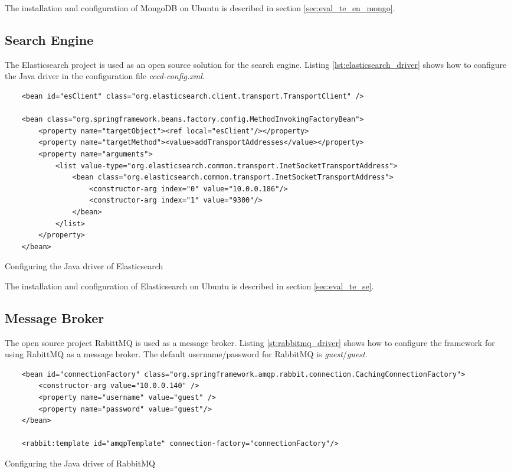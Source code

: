 The installation and configuration of MongoDB on Ubuntu is described in section \ref{sec:eval_te_en_mongo}.

\subsection{Search Engine\label{sec:impl_se_en}}
The Elasticsearch project is used as an open source solution for the search engine. Listing \ref{lst:elasticsearch_driver} shows how to configure the Java driver in the configuration file \textit{cccd-config.xml}.

\begin{code}
\begin{verbatim}
	<bean id="esClient" class="org.elasticsearch.client.transport.TransportClient" />
	
	<bean class="org.springframework.beans.factory.config.MethodInvokingFactoryBean">
		<property name="targetObject"><ref local="esClient"/></property>
		<property name="targetMethod"><value>addTransportAddresses</value></property>
		<property name="arguments"> 
			<list value-type="org.elasticsearch.common.transport.InetSocketTransportAddress">
				<bean class="org.elasticsearch.common.transport.InetSocketTransportAddress">
					<constructor-arg index="0" value="10.0.0.186"/>
					<constructor-arg index="1" value="9300"/>
				</bean>
		 	</list>
		</property>
	</bean>
\end{verbatim}
\caption{Configuring the Java driver of Elasticsearch}
\label{lst:elasticsearch_driver}
\end{code}

The installation and configuration of Elasticsearch on Ubuntu is described in section \ref{sec:eval_te_se}.

\subsection{Message Broker\label{sec:impl_mb}}
The open source project RabittMQ is used as a message broker. Listing \ref{st:rabbitmq_driver}  shows how to configure the framework for using RabittMQ as a message broker. The default username/password for RabbitMQ is \textit{guest}/\textit{guest}.

\begin{code}
\begin{verbatim}
	<bean id="connectionFactory" class="org.springframework.amqp.rabbit.connection.CachingConnectionFactory">
	    <constructor-arg value="10.0.0.140" />
		<property name="username" value="guest" />
	    <property name="password" value="guest"/>
	</bean>
	
	<rabbit:template id="amqpTemplate" connection-factory="connectionFactory"/>
\end{verbatim}
\caption{Configuring the Java driver of RabbitMQ}
\label{lst:rabbitmq_driver}
\end{code}

